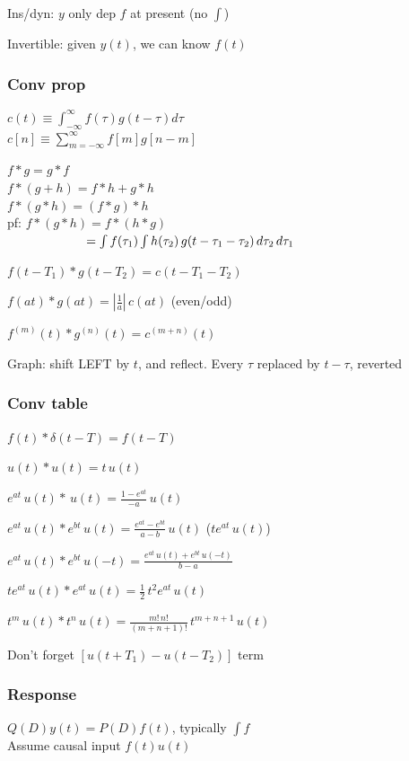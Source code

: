 \documentclass[4pt]{article}
\theoremstyle{definition}
\theoremstyle{definition}
\begin{document}
\begin{landscape}
\begin{multicols}{3}
    Ins/dyn: $y$ only dep $f$ at present (no $\int$)
    
    Invertible: given $y(t)$, we can know $f(t)$
\subsubsection*{Conv prop}
    $c(t) \equiv \int_{-\infty}^{\infty} f(\tau) g(t-\tau) d\tau$\\
    \(c[n] \equiv \sum_{m = -\infty}^{\infty} f[m] g[n-m]\)          %


    $f * g = g * f$\\
    $f * (g + h) = f * h + g * h$\\
    $f * (g * h) = (f * g) * h$\\

        pf: $f * (g * h) = f * (h * g)$\\
        $\hspace{6.25em} = \int f(\tau_1) \int h(\tau_2)\, g(t - \tau_1 - \tau_2) \, d\tau_2 \, d\tau_1$
    
     $f(t - T_1) * g(t - T_2) = c(t - T_1 - T_2)$

     $f(at) * g(at) = |\frac{1}{a}|\, c(at)$ (even/odd)

     $f^{(m)} (t) * g^{(n)} (t) = c^{(m+n)}(t)$


    Graph: shift LEFT by $t$, and reflect. Every $\tau$ replaced by $t-\tau$, reverted
\columnbreak
\subsubsection*{Conv table}
    $f(t) * \delta(t-T) = f(t-T)$
    
    $u(t) * u(t) = t \, u(t)$

    $e^{at} \,u(t)* \,u(t) = \frac{1-e^{at}}{-a}\, u(t)$

    $e^{at}\,u(t) * e^{bt}\,u(t) = \frac{e^{at} - e^{bt}}{a - b}\, u(t)$ ($te^{at} \, u(t)$) 

    $e^{at}\, u(t) * e^{bt} \,u(-t) = \frac{e^{at} \, u(t) + e^{bt} \, u(-t)}{b-a}$

    $te^{at}\,u(t) * e^{at} \,u(t)= \frac{1}{2} \,t^2e^{at} \, u(t)$

    $t^m\, u(t) * t^n \, u(t) = \frac{m!\, n!}{(m+n+1)!}\, t^{m+n+1} \, u(t)$

    Don't forget $[u(t+T_1) - u(t-T_2)]$ term
\subsubsection*{Response}
    $Q(D) y(t) = P(D) f(t)$, typically $\int f$\\
    Assume causal input $f(t) u(t)$


\end{multicols}
\end{landscape}
\end{document}

